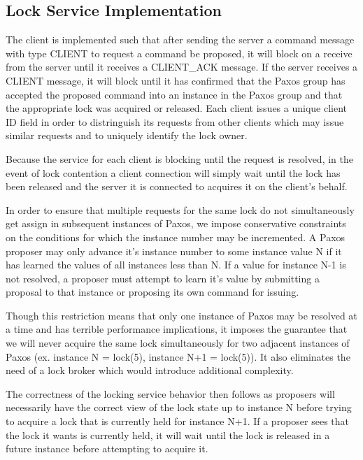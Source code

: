 \documentclass{article}
\begin{document}
\subsection{Lock Service Implementation}

The client is implemented such that after sending the server a command message with type CLIENT to request a command be proposed, it will block on a receive from the server until it receives a CLIENT\_ACK message.
If the server receives a CLIENT message, it will block until it has confirmed that the Paxos group has accepted the proposed command into an instance in the Paxos group and that the appropriate lock was acquired or released.
Each client issues a unique client ID field in order to distringuish its requests from other clients which may issue similar requests and to uniquely identify the lock owner.

Because the service for each client is blocking until the request is resolved, in the event of lock contention a client connection will simply wait until the lock has been released and the server it is connected to acquires it on the client's behalf.

In order to ensure that multiple requests for the same lock do not simultaneously get assign in subsequent instances of Paxos, we impose conservative constraints on the conditions for which the instance number may be incremented.
A Paxos proposer may only advance it's instance number to some instance value N if it has learned the values of all instances less than N.
If a value for instance N-1 is not resolved, a proposer must attempt to learn it's value by submitting a proposal to that instance or proposing its own command for issuing.

Though this restriction means that only one instance of Paxos may be resolved at a time and has terrible performance implications, it imposes the guarantee that we will never acquire the same lock simultaneously for two adjacent instances of Paxos (ex. instance N = lock(5), instance N+1 = lock(5)).
It also eliminates the need of a lock broker which would introduce additional complexity.

The correctness of the locking service behavior then follows as proposers will necessarily have the correct view of the lock state up to instance N before trying to acquire a lock that is currently held for instance N+1.
If a proposer sees that the lock it wants is currently held, it will wait until the lock is released in a future instance before attempting to acquire it.
\end{document}

